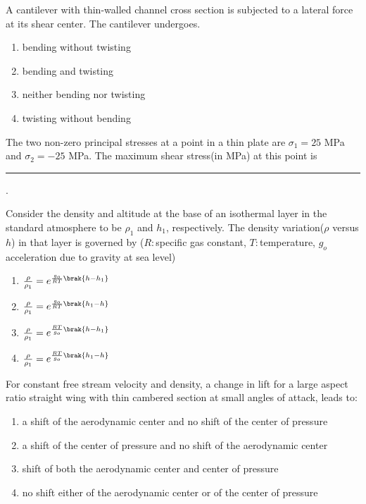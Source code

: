 \iffalse
\chapter{2015}
\author{AI24BTECH11012}
\section{ae}
\fi

    \item A cantilever with thin-walled channel cross section is subjected to a lateral force at its shear center. The cantilever undergoes.
    \begin{enumerate}
    \item bending without twisting
    \item bending and twisting
    \item neither bending nor twisting
    \item twisting without bending
    \end{enumerate}
  \item The two non-zero principal stresses at a point in a thin plate are $\sigma_1=25$ MPa and $\sigma_2=-25$ MPa. The maximum shear stress(in MPa) at this point is \rule{2.5cm}{0.4pt}.
  \item Consider the density and altitude at the base of an isothermal layer in the standard atmosphere to be $\rho_1$ and $h_1$, respectively. The density variation($\rho$ versus $h$) in that layer is governed by ($R:$specific gas constant, $T:$temperature, $g_o$acceleration due to gravity at sea level)
    \begin{enumerate}
    \item $\frac{\rho}{\rho_1}=e^{\frac{g_o}{RT}\brak{h-h_1}}$
    \item $\frac{\rho}{\rho_1}=e^{\frac{g_o}{RT}\brak{h_1-h}}$
    \item $\frac{\rho}{\rho_1}=e^{\frac{RT}{g_o}\brak{h-h_1}}$
    \item $\frac{\rho}{\rho_1}=e^{\frac{RT}{g_o}\brak{h_1-h}}$
    \end{enumerate}
  \item For constant free stream velocity and density, a change in lift for a large aspect ratio straight wing with thin cambered section at small angles of attack, leads to:
  \begin{enumerate}
  \item a shift of the aerodynamic center and no shift of the center of pressure
  \item a shift of the center of pressure and no shift of the aerodynamic center
  \item shift of both the aerodynamic center and center of pressure
  \item no shift either of the aerodynamic center or of the center of pressure
  \end{enumerate}
